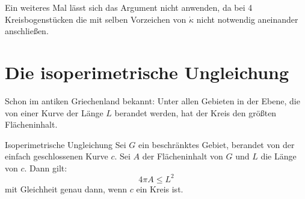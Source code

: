 \documentclass[11pt]{scrbook}
\begin{document}
\begin{note*}
Ein weiteres Mal lässt sich das Argument nicht anwenden, da bei 4 Kreisbogenstücken die mit selben Vorzeichen von $\dot \kappa$ nicht notwendig aneinander anschließen.
\end{note*}

\section{Die isoperimetrische Ungleichung}
Schon im antiken Griechenland bekannt: Unter allen Gebieten in der Ebene, die von einer Kurve der Länge $L$ berandet werden, hat der Kreis den größten Flächeninhalt.

\begin{st}{Isoperimetrische Ungleichung}
\label{6.1}
Sei $G$ ein beschränktes Gebiet, berandet von der einfach geschlossenen Kurve $c$. Sei $A$ der Flächeninhalt von $G$ und $L$ die Länge von $c$. Dann gilt: \[ 4 \pi A \leq L^2 \]
mit Gleichheit genau dann, wenn $c$ ein Kreis ist.
\end{st}
\end{document}
